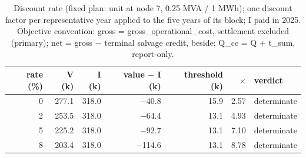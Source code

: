 \begin{table}[htbp]
\centering
\scriptsize
\caption{Discount rate (fixed plan: unit at node 7, 0.25 MVA / 1 MWh); one discount factor per representative year applied to the five years of its block; I paid in 2025. Objective convention: gross = gross\_operational\_cost, settlement excluded (primary); net = gross $-$ terminal salvage credit, beside; Q\_cc = Q + t\_sum, report-only.}
\label{tab:T7}
\begin{tabular}{rrrrrrl}
\toprule
rate (\%) & V (k\texteuro{}) & I (k\texteuro{}) & value $-$ I (k\texteuro{}) & threshold (k\texteuro{}) & $\times$ & verdict \\
\midrule
0 & 277.1 & 318.0 & $-$40.8 & 15.9 & 2.57 & determinate \\
2 & 253.5 & 318.0 & $-$64.4 & 13.1 & 4.93 & determinate \\
5 & 225.2 & 318.0 & $-$92.7 & 13.1 & 7.10 & determinate \\
8 & 203.4 & 318.0 & $-$114.6 & 13.1 & 8.78 & determinate \\
\bottomrule
\end{tabular}
\end{table}
